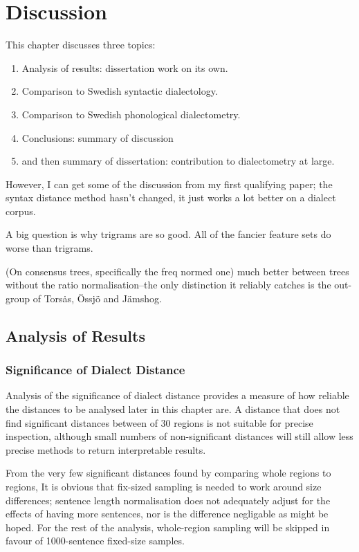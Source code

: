 \chapter{Discussion}

This chapter discusses three topics:

\begin{enumerate}
\item Analysis of results: dissertation work on its own.
\item Comparison to Swedish syntactic dialectology.
\item Comparison to Swedish phonological dialectometry.
\item Conclusions: summary of discussion
\item and then summary of dissertation: contribution to dialectometry at large.
\end{enumerate}

However, I can get some of the discussion from my first qualifying
paper; the syntax distance method hasn't changed, it just works a lot
better on a dialect corpus.

A big question is why trigrams are so good. All of the fancier feature
sets do worse than trigrams.

(On consensus trees, specifically the freq normed one)
much better between trees without the ratio normalisation--the only
distinction it reliably catches is the out-group of Tors\.as, \"Ossj\"o
and J\"amshog.


\section{Analysis of Results}


\subsection{Significance of Dialect Distance}

Analysis of the significance of dialect distance provides a measure of
how reliable the distances to be analysed later in this chapter are. A
distance that does not find significant distances between of 30
regions is not suitable for precise inspection, although small numbers
of non-significant distances will still allow less precise methods to
return interpretable results.

From the very few significant distances found by comparing whole
regions to regions, It is obvious that fix-sized sampling is needed to
work around size differences; sentence length normalisation does not
adequately adjust for the effects of having more sentences, nor is the
difference negligable as might be hoped. For the rest of the analysis,
whole-region sampling will be skipped in favour of 1000-sentence
fixed-size samples.

